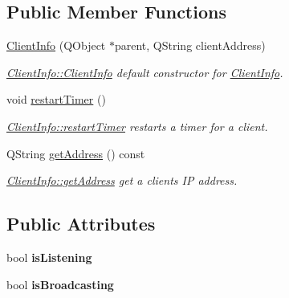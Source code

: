 \subsection*{Public Member Functions}
\begin{DoxyCompactItemize}
\item 
\hyperlink{class_client_info_a11c68fac6d389a2ad23fcb38452414d3}{Client\+Info} (Q\+Object $\ast$parent, Q\+String client\+Address)
\begin{DoxyCompactList}\small\item\em \hyperlink{class_client_info_a11c68fac6d389a2ad23fcb38452414d3}{Client\+Info\+::\+Client\+Info} default constructor for \hyperlink{class_client_info}{Client\+Info}. \end{DoxyCompactList}\item 
\hypertarget{class_client_info_a8dd4595978e5ff522b265f8b69dda437}{void \hyperlink{class_client_info_a8dd4595978e5ff522b265f8b69dda437}{restart\+Timer} ()}\label{class_client_info_a8dd4595978e5ff522b265f8b69dda437}

\begin{DoxyCompactList}\small\item\em \hyperlink{class_client_info_a8dd4595978e5ff522b265f8b69dda437}{Client\+Info\+::restart\+Timer} restarts a timer for a client. \end{DoxyCompactList}\item 
Q\+String \hyperlink{class_client_info_af84ec371c9c598a9fb8aee80ff951644}{get\+Address} () const 
\begin{DoxyCompactList}\small\item\em \hyperlink{class_client_info_af84ec371c9c598a9fb8aee80ff951644}{Client\+Info\+::get\+Address} get a clients I\+P address. \end{DoxyCompactList}\end{DoxyCompactItemize}
\subsection*{Public Attributes}
\begin{DoxyCompactItemize}
\item 
\hypertarget{class_client_info_ac8f77925933a5106abde8bec8bf17ade}{bool {\bfseries is\+Listening}}\label{class_client_info_ac8f77925933a5106abde8bec8bf17ade}

\item 
\hypertarget{class_client_info_a0cc5a8085094d51b3b7225f39cea1ceb}{bool {\bfseries is\+Broadcasting}}\label{class_client_info_a0cc5a8085094d51b3b7225f39cea1ceb}

\end{DoxyCompactItemize}
